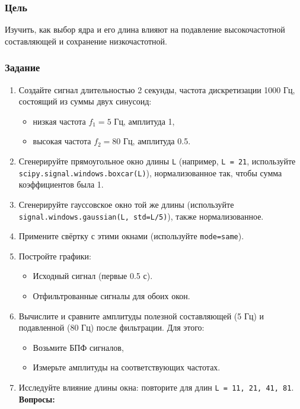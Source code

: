\documentclass[12pt,a4paper,openany]{book}
\providecommand{\tightlist}{\setlength{\itemsep}{0pt}\setlength{\parskip}{0pt}}
\begin{document}
\subsubsection*{Цель}

Изучить, как выбор ядра и его длина влияют на подавление высокочастотной составляющей и сохранение низкочастотной.

\subsubsection*{Задание}

\begin{enumerate}
\def\labelenumi{\arabic{enumi}.}
\tightlist
\item
  Создайте сигнал длительностью 2 секунды, частота дискретизации 1000 Гц, состоящий из суммы двух синусоид:

  \begin{itemize}
  \tightlist
  \item
    низкая частота \(f_1 = 5\) Гц, амплитуда 1,
  \item
    высокая частота \(f_2 = 80\) Гц, амплитуда 0.5.
  \end{itemize}
\item
  Сгенерируйте прямоугольное окно длины \texttt{L} (например, \texttt{L\ =\allowbreak{}\ 21}, используйте \texttt{scipy.\allowbreak{}signal.\allowbreak{}windows.\allowbreak{}boxcar(\allowbreak{}L)}), нормализованное так, чтобы сумма коэффициентов была 1.
\item
  Сгенерируйте гауссовское окно той же длины (используйте \texttt{signal.\allowbreak{}windows.\allowbreak{}gaussian(\allowbreak{}L,\allowbreak{}\ std=\allowbreak{}L/\allowbreak{}5)}), также нормализованное.
\item
  Примените свёртку с этими окнами (используйте \texttt{mode=\allowbreak{}\textquotesingle{}\allowbreak{}same\textquotesingle{}\allowbreak{}}).
\item
  Постройте графики:

  \begin{itemize}
  \tightlist
  \item
    Исходный сигнал (первые 0.5 с).
  \item
    Отфильтрованные сигналы для обоих окон.
  \end{itemize}
\item
  Вычислите и сравните амплитуды полезной составляющей (5 Гц) и подавленной (80 Гц) после фильтрации. Для этого:

  \begin{itemize}
  \tightlist
  \item
    Возьмите БПФ сигналов,
  \item
    Измерьте амплитуды на соответствующих частотах.
  \end{itemize}
\item
  Исследуйте влияние длины окна: повторите для длин \texttt{L\ =\allowbreak{}\ 11,\allowbreak{}\ 21,\allowbreak{}\ 41,\allowbreak{}\ 81}.
  \textbf{Вопросы:}
\end{enumerate}
\end{document}
